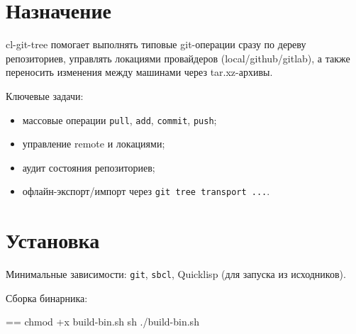 \documentclass{book}
\makeatletter
\renewcommand\mainmatter{\clearpage\@mainmattertrue\pagenumbering{arabic}}
\newenvironment{Texinfopreformatted}{%
  \par\GNUTobeylines\obeyspaces\frenchspacing\parskip=\z@\parindent=\z@}{}
{\catcode`\^^M=13 \gdef\GNUTobeylines{\catcode`\^^M=13 \def^^M{\null\par}}}
\newenvironment{Texinfoindented}{\begin{list}{}{}\item\relax}{\end{list}}
\renewcommand{\_}{\Texinfounderscore\discretionary{}{}{}}
\makeatother
\begin{document}
\frontmatter
\pagestyle{empty}%
\pagestyle{singlepagenum}%
\tableofcontents\newpage
\mainmatter
\pagestyle{single}%
\label{anchor:Top}%
\chapter{{Назначение}}
\label{anchor:_041d_0430_0437_043d_0430_0447_0435_043d_0438_0435}%

cl-git-tree помогает выполнять типовые git-операции сразу по дереву репозиториев,
управлять локациями провайдеров (local/github/gitlab), а также переносить изменения
между машинами через tar.xz-архивы.

Ключевые задачи:
\begin{itemize}[label=\textbullet{}]
\item массовые операции \texttt{pull}, \texttt{add}, \texttt{commit}, \texttt{push};
\item управление remote и локациями;
\item аудит состояния репозиториев;
\item офлайн-экспорт/импорт через \texttt{git tree transport ...}.
\end{itemize}

\chapter{{Установка}}
\label{anchor:_0423_0441_0442_0430_043d_043e_0432_043a_0430}%

Минимальные зависимости: \texttt{git}, \texttt{sbcl}, Quicklisp (для запуска из исходников).

Сборка бинарника:
\begin{Texinfoindented}
\begin{Texinfopreformatted}%
\ttfamily chmod +x build-bin.sh
sh ./build-bin.sh
\end{Texinfopreformatted}
\end{Texinfoindented}
\end{document}

